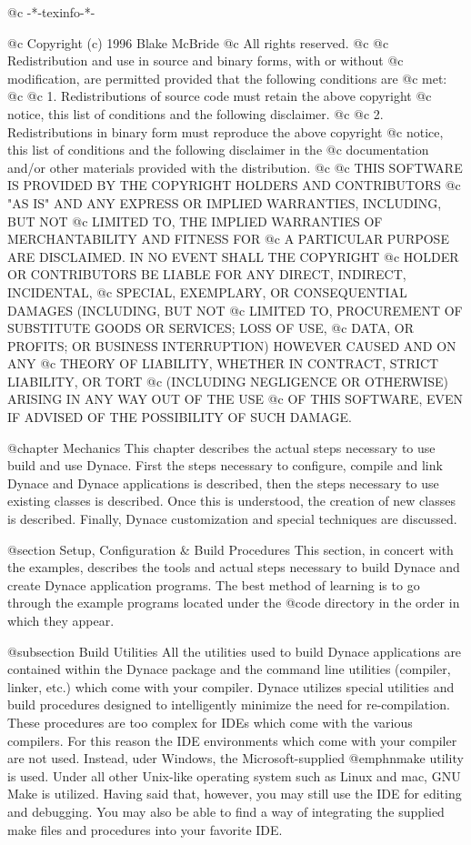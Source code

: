 @c -*-texinfo-*-

@c  Copyright (c) 1996 Blake McBride
@c  All rights reserved.
@c
@c  Redistribution and use in source and binary forms, with or without
@c  modification, are permitted provided that the following conditions are
@c  met:
@c
@c  1. Redistributions of source code must retain the above copyright
@c  notice, this list of conditions and the following disclaimer.
@c
@c  2. Redistributions in binary form must reproduce the above copyright
@c  notice, this list of conditions and the following disclaimer in the
@c  documentation and/or other materials provided with the distribution.
@c
@c  THIS SOFTWARE IS PROVIDED BY THE COPYRIGHT HOLDERS AND CONTRIBUTORS
@c  "AS IS" AND ANY EXPRESS OR IMPLIED WARRANTIES, INCLUDING, BUT NOT
@c  LIMITED TO, THE IMPLIED WARRANTIES OF MERCHANTABILITY AND FITNESS FOR
@c  A PARTICULAR PURPOSE ARE DISCLAIMED. IN NO EVENT SHALL THE COPYRIGHT
@c  HOLDER OR CONTRIBUTORS BE LIABLE FOR ANY DIRECT, INDIRECT, INCIDENTAL,
@c  SPECIAL, EXEMPLARY, OR CONSEQUENTIAL DAMAGES (INCLUDING, BUT NOT
@c  LIMITED TO, PROCUREMENT OF SUBSTITUTE GOODS OR SERVICES; LOSS OF USE,
@c  DATA, OR PROFITS; OR BUSINESS INTERRUPTION) HOWEVER CAUSED AND ON ANY
@c  THEORY OF LIABILITY, WHETHER IN CONTRACT, STRICT LIABILITY, OR TORT
@c  (INCLUDING NEGLIGENCE OR OTHERWISE) ARISING IN ANY WAY OUT OF THE USE
@c  OF THIS SOFTWARE, EVEN IF ADVISED OF THE POSSIBILITY OF SUCH DAMAGE.

@chapter Mechanics
This chapter describes the actual steps necessary to use build and use
Dynace.  First the steps necessary to configure, compile and link Dynace
and Dynace applications is described, then the steps necessary to use
existing classes is described.  Once this is understood, the creation of
new classes is described.  Finally, Dynace customization and special
techniques are discussed.


@section Setup, Configuration & Build Procedures
This section, in concert with the examples, describes the tools and
actual steps necessary to build Dynace and create Dynace application
programs.  The best method of learning is to go through the example
programs located under the @code{\DYNACE\EXAMPLES} directory in the
order in which they appear.

@subsection Build Utilities
All the utilities used to build Dynace applications are contained
within the Dynace package and the command line utilities (compiler,
linker, etc.) which come with your compiler.  Dynace utilizes special
utilities and build procedures designed to intelligently minimize the
need for re-compilation.  These procedures are too complex for IDEs
which come with the various compilers.  For this reason the IDE
environments which come with your compiler are not used.  Instead,
uder Windows, the Microsoft-supplied @emph{nmake} utility is used.  Under all
other Unix-like operating system such as Linux and mac, GNU Make is
utilized.  Having said that, however, you may still use the IDE for
editing and debugging.  You may also be able to find a way of
integrating the supplied make files and procedures into your favorite
IDE.

